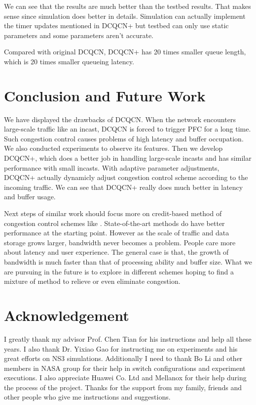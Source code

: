 \documentclass[12pt,a4paper]{article}
\begin{document}
We can see that the results are much better than the testbed results.
That makes sense since simulation does better in details.
Simulation can actually implement the timer updates mentioned in DCQCN+ but testbed can only use static parameters and some parameters
aren't accurate.

Compared with original DCQCN, DCQCN+ has 20 times smaller queue length, which is 20 times smaller queueing latency.


\section{Conclusion and Future Work}

We have displayed the drawbacks of DCQCN.
When the network encounters large-scale traffic like an incast, DCQCN is forced to trigger PFC for a long time.
Such congestion control causes problems of high latency and buffer occupation.
We also conducted experiments to observe its features.
Then we develop DCQCN+, which does a better job in handling large-scale incasts and has similar performance with small incasts.
With adaptive parameter adjustments, DCQCN+ actually dynamicly adjust congestion control scheme according to the incoming traffic.
We can see that DCQCN+ really does much better in latency and buffer usage.

Next steps of similar work should focus more on credit-based method of congestion control schemes like \cite{credit}.
State-of-the-art methods do have better performance at the starting point.
However as the scale of traffic and data storage grows larger, bandwidth never becomes a problem.
People care more about latency and user experience.
The general case is that, the growth of bandwidth is much faster than that of processing ability and buffer size.
What we are pursuing in the future is to explore in different schemes hoping to find a mixture of method to relieve or even eliminate congestion.

\section*{Acknowledgement}

I greatly thank my advisor Prof. Chen Tian for his instructions and help all these years.
I also thank Dr. Yixiao Gao for instructing me on experiments and his great efforts on NS3 simulations.
Additionally I need to thank Bo Li and other members in NASA group for their help in switch configurations and experiment executions.
I also appreciate Huawei Co. Ltd and Mellanox for their help during the process of the project.
Thanks for the support from my family, friends and other people who give me instructions and suggestions.
\end{document}

